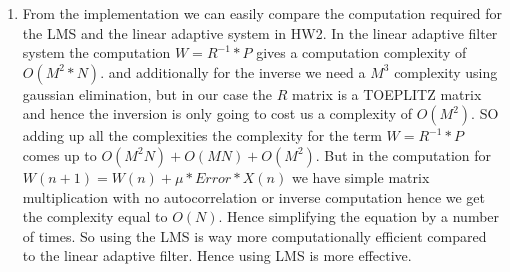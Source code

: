 \documentclass[10pt, letterpaper]{article}
\begin{document}
\begin{enumerate}
\item From the implementation we can easily compare the computation required for the LMS and the linear adaptive system in HW2. In the linear adaptive filter system the computation $W = R^{-1}*P$ gives a computation complexity of $O(M^{2}*N)$. and additionally for the inverse we need a $M^{3}$ complexity using gaussian elimination, but in our case the $R$ matrix is a TOEPLITZ matrix and hence the inversion is only going to cost us a complexity of $O(M^{2})$. SO adding up all the complexities the complexity for the term $W = R^{-1}*P$ comes up to $O(M^{2}N) + O(MN) + O(M^{2}) $.  But in the computation for $W(n+1) = W(n) + \mu * Error * X(n)$ we have simple matrix multiplication with no autocorrelation or inverse computation hence we get the complexity equal to $O(N)$. Hence simplifying the equation by a number of times. So using the LMS is way more computationally efficient compared to the linear adaptive filter. Hence using LMS is more effective. 

\end{enumerate}
\end{document}
